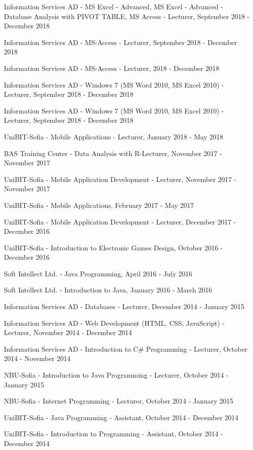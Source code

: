 \documentclass[english,a4paper]{europasscv}
\begin{document}
\begin{europasscv}
{\begin{ecvitemize}
    \item Information Services AD - MS Excel - Advanced, MS Excel - Advanced - Database Analysis with PIVOT TABLE, MS Access - Lecturer, September 2018 - December 2018
    \item Information Services AD - MS-Access - Lecturer, September 2018 - December 2018
    \item Information Services AD - MS-Access - Lecturer, 2018 - December 2018
    \item Information Services AD - Windows 7 (MS Word 2010, MS Excel 2010) - Lecturer, September 2018 - December 2018
    \item Information Services AD - Windows 7 (MS Word 2010, MS Excel 2010) - Lecturer, September 2018 - December 2018
    \item UniBIT-Sofia - Mobile Applications - Lecturer, January 2018 - May 2018
    \item BAS Training Center - Data Analysis with R-Lecturer, November 2017 - November 2017
    \item UniBIT-Sofia - Mobile Application Development - Lecturer, November 2017 - November 2017
    \item UniBIT-Sofia - Mobile Applications, February 2017 - May 2017
    \item UniBIT-Sofia - Mobile Application Development - Lecturer, December 2017 - December 2016
    \item UniBIT-Sofia - Introduction to Electronic Games Design, October 2016 - December 2016
    \item Soft Intellect Ltd. - Java Programming, April 2016 - July 2016
    \item Soft Intellect Ltd. - Introduction to Java, January 2016 - March 2016
    \item Information Services AD - Databases - Lecturer, December 2014 - January 2015
    \item Information Services AD - Web Development (HTML, CSS, JavaScript) - Lecturer, November 2014 - December 2014
    \item Information Services AD - Introduction to C\# Programming - Lecturer, October 2014 - November 2014
    \item NBU-Sofia - Introduction to Java Programming - Lecturer, October 2014 - January 2015
    \item NBU-Sofia - Internet Programming - Lecturer, October 2014 - January 2015
    \item UniBIT-Sofia - Java Programming - Assistant, October 2014 - December 2014
    \item UniBIT-Sofia - Introduction to Programming - Assistant, October 2014 - December 2014

\end{ecvitemize}}
\end{europasscv}
\end{document}
